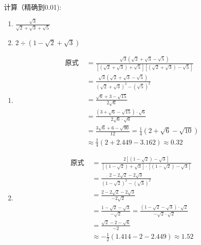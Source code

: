 \begin{example}
    计算（精确到0.01):
\begin{multicols}{2}
    \begin{enumerate}
        \item $\frac{\sqrt{3}}{\sqrt{2}+\sqrt{3}+\sqrt{5}}$
        \item $2\div \left(1-\sqrt{2}+\sqrt{3}\right)$
    \end{enumerate}
\end{multicols}
\end{example}

\begin{solution}
    \begin{enumerate}
    \item \[\begin{split}
\text{原式 }&=\frac{\sqrt{3}(\sqrt{2}+\sqrt{3}-\sqrt{5})}{\left[(\sqrt{2}+\sqrt{3})+\sqrt{5}\right]\left[(\sqrt{2}+\sqrt{3})-\sqrt{5}\right]}   \\
&= \frac{\sqrt{3}(\sqrt{2}+\sqrt{3}-\sqrt{5})}{(\sqrt{2}+\sqrt{3})^2-(\sqrt{5})^2}  \\
&= \frac{\sqrt{6}+3-\sqrt{15}}{2\sqrt{6}}\\
&= \frac{(3+\sqrt{6}-\sqrt{15})\cdot \sqrt{6}}{2\sqrt{6}\cdot \sqrt{6}}\\
&=\frac{3\sqrt{6}+6-\sqrt{90}}{12}=\frac{1}{4}\left(2+\sqrt{6}-\sqrt{10}\right)\\
&\approx \frac{1}{4}(2+2.449-3.162)\approx 0.32
    \end{split}\]
            \item \[\begin{split}
\text{原式 }&= \frac{2\left[(1-\sqrt{2})-\sqrt{3}\right]}{\left[(1-\sqrt{2})+\sqrt{3}\right]\cdot \left[(1-\sqrt{2})-\sqrt{3}\right]}  \\
&= \frac{2-2\sqrt{2}-2\sqrt{3}}{(1-\sqrt{2})^2-(\sqrt{3})^2} \\
&=  \frac{2-2\sqrt{2}-2\sqrt{3}}{-2\sqrt{2}}  \\
&= \frac{1-\sqrt{2}-\sqrt{3}}{-\sqrt{2}} =\frac{(1-\sqrt{2}-\sqrt{3})\cdot \sqrt{2}}{-\sqrt{2}\cdot \sqrt{2}}\\
&=\frac{\sqrt{2}-2-\sqrt{6}}{-2}\\
&\approx -\frac{1}{2}(1.414-2-2.449)\approx 1.52
    \end{split}\]
    \end{enumerate}
\end{solution}



